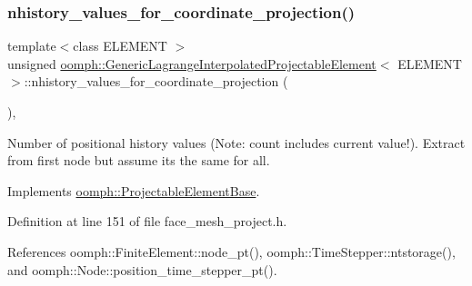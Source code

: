 \subsubsection{\texorpdfstring{nhistory\+\_\+values\+\_\+for\+\_\+coordinate\+\_\+projection()}{nhistory\_values\_for\_coordinate\_projection()}}
{\footnotesize\ttfamily template$<$class E\+L\+E\+M\+E\+NT $>$ \\
unsigned \hyperlink{classoomph_1_1GenericLagrangeInterpolatedProjectableElement}{oomph\+::\+Generic\+Lagrange\+Interpolated\+Projectable\+Element}$<$ E\+L\+E\+M\+E\+NT $>$\+::nhistory\+\_\+values\+\_\+for\+\_\+coordinate\+\_\+projection (\begin{DoxyParamCaption}{ }\end{DoxyParamCaption})\hspace{0.3cm}{\ttfamily [inline]}, {\ttfamily [virtual]}}



Number of positional history values (Note\+: count includes current value!). Extract from first node but assume it\textquotesingle{}s the same for all. 



Implements \hyperlink{classoomph_1_1ProjectableElementBase_ab4ecd0cd24000a3ed675dc7198203c1f}{oomph\+::\+Projectable\+Element\+Base}.



Definition at line 151 of file face\+\_\+mesh\+\_\+project.\+h.



References oomph\+::\+Finite\+Element\+::node\+\_\+pt(), oomph\+::\+Time\+Stepper\+::ntstorage(), and oomph\+::\+Node\+::position\+\_\+time\+\_\+stepper\+\_\+pt().

\mbox{\label{classoomph_1_1GenericLagrangeInterpolatedProjectableElement_a9343241dc18e1331a5b220fd3fbe07a7}} 
